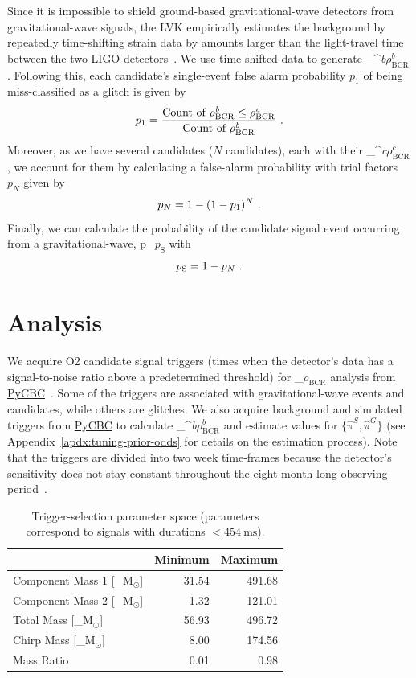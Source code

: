 \documentclass[%
 nofootinbib,
 amsmath,amssymb,
 aps,
 twocolumn,
 superscriptaddress
]{revtex4-2}
\newcommand{\pycbc}{{\sc \href{https://pycbc.org/}{{PyCBC}}}\xspace}
\newcommand{\fancytext}[1]{{\relax\ifmmode#1\else $#1$\fi}\xspace}
\newcommand{\mathcmd}[1]{{\sc \relax\ifmmode#1\else $#1$\fi}\xspace}
\newcommand{\bcr}{\mathcmd{\rho_\text{BCR}}}
\newcommand{\bgrdbcr}{\mathcmd{\rho_\text{BCR}^\textit{b}}}
\newcommand{\candbcr}{\mathcmd{\rho_\text{BCR}^\textit{c}}}
\newcommand{\msun}{\mathcmd{\text{M}_\odot}}
\newcommand{\fap}{\mathcmd{p_N}}
\newcommand{\pastrobcr}{\fancytext{p_\text{S}}}
\begin{document}
Since it is impossible to shield ground-based gravitational-wave detectors from gravitational-wave signals, the LVK empirically estimates the background by repeatedly time-shifting strain data by amounts larger than the light-travel time between the two LIGO detectors~\cite{GWTC1}. We use time-shifted data to generate \bgrdbcr. Following this, each candidate's single-event false alarm probability $p_1$ of being miss-classified as a glitch is given by
\begin{equation}
    p_1 = \frac{\text{Count of } \bgrdbcr \leq \candbcr}{\text{Count of } \bgrdbcr} \ .
\end{equation}
Moreover, as we have several candidates ($N$ candidates), each with their \candbcr, we account for them by calculating a false-alarm probability with trial factors $p_N$ given by
\begin{equation}
    \fap = 1 - (1-p_1)^N \ .
\end{equation}
Finally, we can calculate the probability of the candidate signal event occurring from  a gravitational-wave, \pastrobcr with 
\begin{equation}
\pastrobcr = 1 - \fap \ . 
\end{equation}


\section{Analysis}\label{sec:Analysis}

We acquire O2 candidate signal triggers (times when the detector's data has a signal-to-noise ratio above a predetermined threshold) for \bcr analysis from \pycbc~\cite{pycbc_code, pycbc_og0, pycbc_og1, pycbc_og2, pycbc_og3, pycbc_og4, pycbc_og5, pycbc_og6}.  Some of the triggers are associated with gravitational-wave events and candidates, while others are glitches. We also acquire background and simulated triggers from \pycbc to calculate \bgrdbcr and estimate values for $\{\hat{\pi}^S,\hat{\pi}^G\}$ (see Appendix~\ref{apdx:tuning-prior-odds} for details on the estimation process). Note that the triggers are divided into two week time-frames because the detector's sensitivity does not stay constant throughout the eight-month-long observing period~\cite{pycbc_og4}.

\begin{table}[t]
\caption[BBH parameters correspond to duration $<454\ \text{ms}$]{\label{tab:parameters}Trigger-selection parameter space (parameters correspond to signals with durations $<454 \ \text{ms}$). }
\centering
\begin{tabular}{lrr}
\toprule
  & Minimum & Maximum\\
\midrule
Component Mass 1 [\msun] & 31.54 & 491.68\\
Component Mass 2 [\msun] & 1.32 & 121.01\\
Total Mass [\msun] & 56.93 & 496.72\\
Chirp Mass [\msun] & 8.00 & 174.56\\
Mass Ratio & 0.01 & 0.98\\
\end{tabular}
\end{table}
\end{document}
